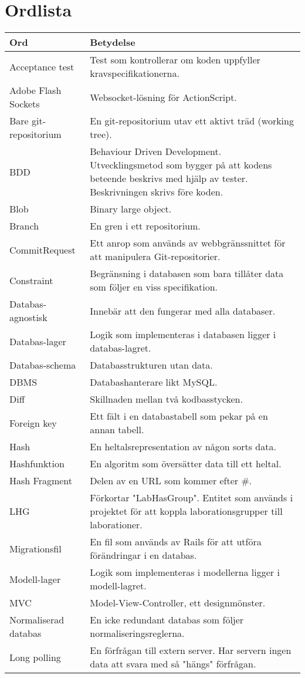 \section{Ordlista}
\label{sec:ordlista}
\small
\begin{tabular} { | l | p{10cm} | }
\hline
\bf{Ord} & \bf{Betydelse} \\
\hline
Acceptance test	& Test som kontrollerar om koden uppfyller kravspecifikationerna. \\
\hline
Adobe Flash Sockets & Websocket-lösning för ActionScript. \\
\hline
Bare git-repositorium & En git-repositorium utav ett aktivt träd (working tree). \\
\hline
BDD & Behaviour Driven Development. Utvecklingsmetod som bygger på att kodens
beteende beskrivs med hjälp av tester. Beskrivningen skrivs före koden. \\
\hline
Blob & Binary large object.\\
\hline
Branch & En gren i ett repositorium. \\
\hline
CommitRequest & Ett anrop som används av webbgränssnittet för att manipulera Git-repositorier. \\
\hline
Constraint & Begränsning i databasen som bara tillåter data som följer en viss specifikation. \\
\hline
Databas-agnostisk & Innebär att den fungerar med alla databaser. \\
\hline
Databas-lager & Logik som implementeras i databasen ligger i databas-lagret. \\
\hline
Databas-schema & Databasstrukturen utan data. \\
\hline
DBMS & Databashanterare likt MySQL. \\
\hline
Diff & Skillnaden mellan två kodbasstycken. \\
\hline
Foreign key & Ett fält i en databastabell som pekar på en annan tabell. \\
\hline
Hash & En heltalsrepresentation av någon sorts data. \\
\hline
Hashfunktion & En algoritm som översätter data till ett heltal. \\
\hline
Hash Fragment & Delen av en URL som kommer efter \#. \\
\hline
LHG & Förkortar "LabHasGroup". Entitet som används i projektet för att koppla laborationsgrupper till laborationer. \\
\hline
Migrationsfil & En fil som används av Rails för att utföra förändringar i en databas. \\
\hline
Modell-lager & Logik som implementeras i modellerna ligger i modell-lagret. \\
\hline
MVC & Model-View-Controller, ett designmönster. \\
\hline
Normaliserad databas & En icke redundant databas som följer normaliseringsreglerna. \\
\hline
Long polling & En förfrågan till extern server. Har servern ingen data att svara med så "hängs" förfrågan. \\
\hline
\end{tabular}

